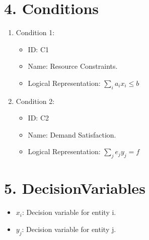 \documentclass[a4paper,12pt]{article}
\begin{document}
\section{4. Conditions}
\begin{enumerate}[label=\arabic*.]
    \item Condition 1:
    \begin{itemize}[noitemsep]
        \item ID: C1
        \item Name: Resource Constraints.
        \item Logical Representation: \( \sum_{i} a_i x_i \leq b \)
    \end{itemize}
    
    \item Condition 2:
    \begin{itemize}[noitemsep]
        \item ID: C2
        \item Name: Demand Satisfaction.
        \item Logical Representation: \( \sum_{j} e_j y_j = f \)
    \end{itemize}
\end{enumerate}

\section{5. DecisionVariables}
\begin{itemize}[noitemsep]
    \item \( x_i \): Decision variable for entity i.
    \item \( y_j \): Decision variable for entity j.
\end{itemize}

\end{document}
